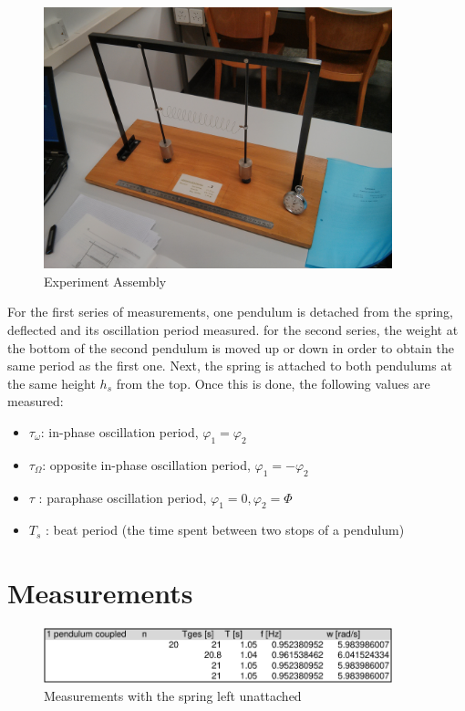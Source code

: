 \documentclass{scrreprt}
\renewcommand{\phi}{\varphi}
\begin{document}
\begin{figure}[H]
	\centering
  \includegraphics[width=0.9\textwidth]{img/assembly.jpg}
	\caption{Experiment Assembly}
	\label{fig:assembly}
\end{figure}
For the first series of measurements, one pendulum is detached from the spring, deflected and its oscillation period measured. for the second series, the weight at the bottom of the second pendulum is moved up or down in order to obtain the same period as the first one. Next, the spring is attached to both pendulums at the same height $h_s$ from the top. Once this is done, the following values are measured:
\begin{itemize}
\item $\tau_{\omega}$: in-phase oscillation period, $\phi_1 = \phi_2$
\item $\tau_{\Omega}$: opposite in-phase oscillation period, $\phi_1 = -\phi_2$
\item $\tau$ : paraphase oscillation period, $\phi_1 = 0, \phi_2 = \Phi$
\item $T_s$ : beat period (the time spent between two stops of a pendulum)
\end{itemize}
\section{Measurements}

\begin{figure}[H]
	\centering
  \includegraphics[width=0.9\textwidth]{diag/uncoupled.pdf}
	\caption{Measurements with the spring left unattached}
	\label{fig:uncoupled}
\end{figure}
\end{document}
